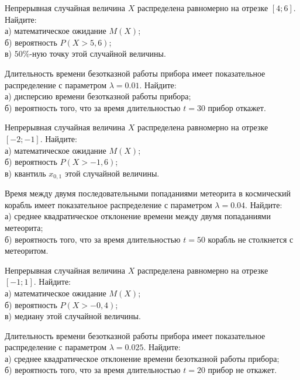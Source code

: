 \vfill

\newpage\setcounter{zad}{0}

\z Непрерывная случайная величина $X$ распределена равномерно на отрезке $[4; 6]$. Найдите: \\ \quad а) математическое ожидание $M(X)$; \\ \quad б) вероятность $P(X>5{,}6)$; \\ \quad в) $50\%$-ную точку этой случайной величины.


\vfill

\z Длительность времени безотказной работы прибора имеет показательное распределение с параметром $\lambda = 0.01$. Найдите: \\ \quad а) дисперсию времени безотказной работы прибора; \\ \quad б) вероятность того, что за время длительностью $t = 30$ прибор  откажет.
 

\vfill

\newpage\setcounter{zad}{0}

\z Непрерывная случайная величина $X$ распределена равномерно на отрезке $[-2; -1]$. Найдите: \\ \quad а) математическое ожидание $M(X)$; \\ \quad б) вероятность $P(X>-1{,}6)$; \\ \quad в) квантиль $x_{0{,}1}$ этой случайной величины.


\vfill

\z Время между двумя последовательными попаданиями метеорита в космический корабль имеет показательное распределение с параметром $\lambda = 0.04$. Найдите: \\ \quad а) среднее квадратическое отклонение времени между двумя попаданиями метеорита; \\ \quad б) вероятность того, что за время длительностью $t = 50$ корабль не столкнется с метеоритом.
 

\vfill

\newpage\setcounter{zad}{0}

\z Непрерывная случайная величина $X$ распределена равномерно на отрезке $[-1; 1]$. Найдите: \\ \quad а) математическое ожидание $M(X)$; \\ \quad б) вероятность $P(X>-0{,}4)$; \\ \quad в) медиану этой случайной величины.


\vfill

\z Длительность времени безотказной работы прибора имеет показательное распределение с параметром $\lambda = 0.025$. Найдите: \\ \quad а) среднее квадратическое отклонение времени безотказной работы прибора; \\ \quad б) вероятность того, что за время длительностью $t = 20$ прибор не откажет.
 

